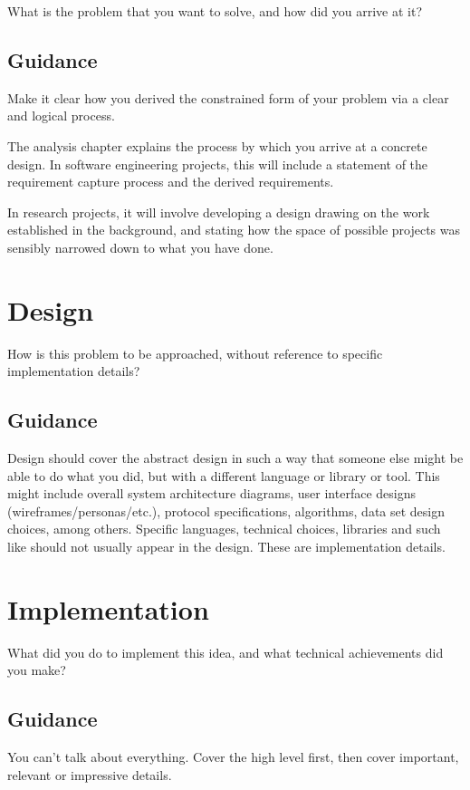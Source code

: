 \documentclass{l4proj}
\begin{document}
What is the problem that you want to solve, and how did you arrive at it?
\section{Guidance}
Make it clear how you derived the constrained form of your problem via a clear and logical process. 

The analysis chapter explains the process by which you arrive at a concrete design. In software 
engineering projects, this will include a statement of the requirement capture process and the
derived requirements.

In research projects, it will involve developing a design drawing on
the work established in the background, and stating how the space of possible projects was
sensibly narrowed down to what you have done.

\chapter{Design}
How is this problem to be approached, without reference to specific implementation details? 
\section{Guidance}
Design should cover the abstract design in such a way that someone else might be able to do what you did, 
but with a different language or library or tool. This might include overall system architecture diagrams,
user interface designs (wireframes/personas/etc.), protocol specifications, algorithms, data set design choices,
among others. Specific languages, technical choices, libraries and such like should not usually appear in the design. These are implementation details.


\chapter{Implementation}
What did you do to implement this idea, and what technical achievements did you make?
\section{Guidance}
You can't talk about everything. Cover the high level first, then cover important, relevant or impressive details.
\end{document}
